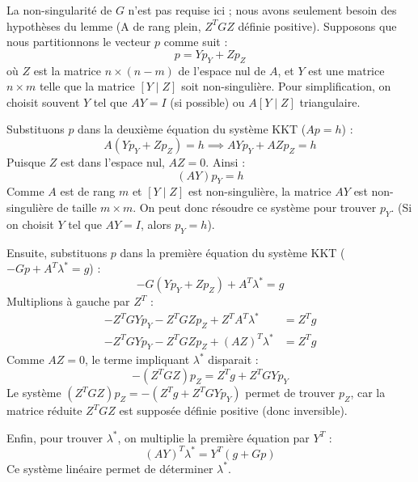 La non-singularité de $G$ n'est pas requise ici ; nous avons seulement besoin des hypothèses du lemme (A de rang plein, $Z^T G Z$ définie positive).
Supposons que nous partitionnons le vecteur $p$ comme suit :
\begin{equation}
    p = Y p_Y + Z p_Z
\end{equation}
où $Z$ est la matrice $n \times (n-m)$ de l'espace nul de $A$, et $Y$ est une matrice $n \times m$ telle que la matrice $[Y \mid Z]$ soit non-singulière.
Pour simplification, on choisit souvent $Y$ tel que $AY = I$ (si possible) ou $A [Y \mid Z]$ triangulaire.

Substituons $p$ dans la deuxième équation du système KKT ($Ap = h$) :
\begin{equation}
    A(Y p_Y + Z p_Z) = h \implies AY p_Y + AZ p_Z = h
\end{equation}
Puisque $Z$ est dans l'espace nul, $AZ = 0$. Ainsi :
\begin{equation}
    (AY) p_Y = h
\end{equation}
Comme $A$ est de rang $m$ et $[Y \mid Z]$ est non-singulière, la matrice $AY$ est non-singulière de taille $m \times m$.
On peut donc résoudre ce système pour trouver $p_Y$. (Si on choisit $Y$ tel que $AY=I$, alors $p_Y = h$).

Ensuite, substituons $p$ dans la première équation du système KKT ($ -Gp + A^T \lambda^* = g $) :
\begin{equation}
    -G(Y p_Y + Z p_Z) + A^T \lambda^* = g
\end{equation}
Multiplions à gauche par $Z^T$ :
\begin{align*}
    -Z^T G Y p_Y - Z^T G Z p_Z + Z^T A^T \lambda^* &= Z^T g \\
    -Z^T G Y p_Y - Z^T G Z p_Z + (AZ)^T \lambda^* &= Z^T g
\end{align*}
Comme $AZ=0$, le terme impliquant $\lambda^*$ disparait :
\begin{equation}
    -(Z^T G Z) p_Z = Z^T g + Z^T G Y p_Y
\end{equation}
Le système $(Z^T G Z) p_Z = -(Z^T g + Z^T G Y p_Y)$ permet de trouver $p_Z$, car la matrice réduite $Z^T G Z$ est supposée définie positive (donc inversible).

Enfin, pour trouver $\lambda^*$, on multiplie la première équation par $Y^T$ :
\begin{equation}
    (AY)^T \lambda^* = Y^T (g + Gp)
\end{equation}
Ce système linéaire permet de déterminer $\lambda^*$.

